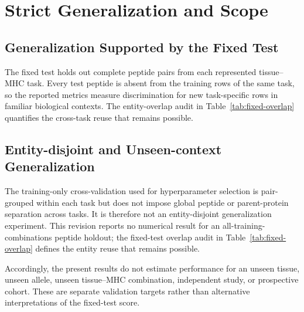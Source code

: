 \section{Strict Generalization and Scope}

\subsection{Generalization Supported by the Fixed Test}

The fixed test holds out complete peptide pairs from each represented tissue--MHC task. Every test peptide is absent from the training rows of the same task, so the reported metrics measure discrimination for new task-specific rows in familiar biological contexts. The entity-overlap audit in Table~\ref{tab:fixed-overlap} quantifies the cross-task reuse that remains possible.

\subsection{Entity-disjoint and Unseen-context Generalization}

The training-only cross-validation used for hyperparameter selection is pair-grouped within each task but does not impose global peptide or parent-protein separation across tasks. It is therefore not an entity-disjoint generalization experiment. This revision reports no numerical result for an all-training-combinations peptide holdout; the fixed-test overlap audit in Table~\ref{tab:fixed-overlap} defines the entity reuse that remains possible.

Accordingly, the present results do not estimate performance for an unseen tissue, unseen allele, unseen tissue--MHC combination, independent study, or prospective cohort. These are separate validation targets rather than alternative interpretations of the fixed-test score.
